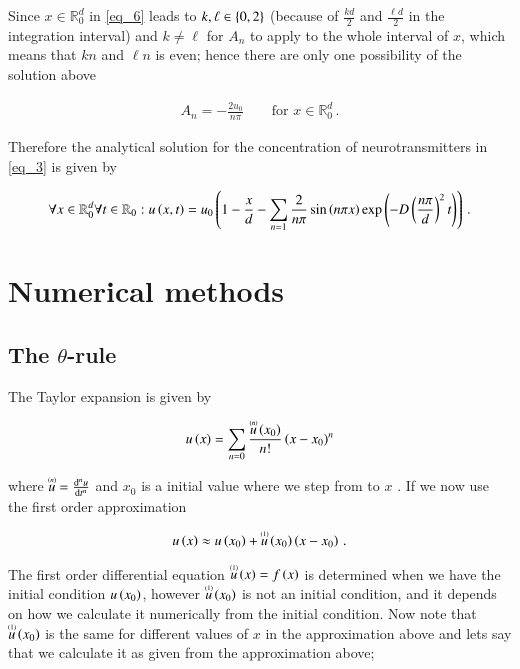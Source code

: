 \documentclass[11pt,english,a4paper]{article}
\begin{document}
\begin{flushleft}
Since $x\in\mathbb{R}_0^d$ in \eqref{eq_6} leads to $k,\ell\in\kr{0,2}$ (because of $\frac{kd}{2}$ and $\frac{\ell d}{2}$ in the integration interval) and $k\neq \ell$ for $A_n$ to apply to the whole interval of $x$, which means that $kn$ and $\ell n$ is even; hence there are only one possibility of the solution above

\begin{align}
A_n = -\frac{2 u_0}{n\pi} \qquad \text{for } x\in\mathbb{R}_0^d\,.
\label{eq_7}
\end{align}

Therefore the analytical solution for the concentration of neurotransmitters in \eqref{eq_3} is given by

\begin{align}
\forall x \in \mathbb{R}_0^d \forall t \in \mathbb{R}_{0}: u\p{x,t} = u_0\p{1-\frac{x}{d} - \sum_{n=1} \frac{2}{n\pi}\sin\p{n\pi x}\exp\p{-D\p{\frac{n\pi}{d}}^2 t}}\,.
\label{eq_8}
\end{align}

\section{Numerical methods}

\subsection{The $\theta$-rule}

The Taylor expansion is given by

\begin{align}
u\p{x} = \sum_{n=0} \frac{\T{u}{(n)}\p{x_0}}{n!}\p{x-x_0}^n
\label{eq_9}
\end{align}

where $\T{u}{(n)} = \frac{\mathrm{d}^n u}{\mathrm{d}t^n}$ and $x_0$ is a initial value where we step from to $x$ . If we now use the first order approximation

\begin{align*}
u\p{x} \approx u\p{x_0} + \T{u}{(1)}\p{x_0}\p{x-x_0} \,.
\end{align*}

The first order differential equation $\T{u}{(1)}\p{x} = f\p{x}$ is determined when we have the initial condition $u\p{x_0}$, however $\T{u}{(1)}\p{x_0}$ is not an initial condition, and it depends on how we calculate it numerically from the initial condition. Now note that $\T{u}{(1)}\p{x_0}$ is the same for different values of $x$ in the approximation above and lets say that we calculate it as given from the approximation above;


\end{flushleft}
\end{document}
